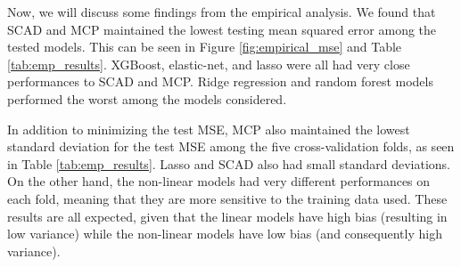 \documentclass{article}
\begin{document}
	
	Now, we will discuss some findings from the empirical analysis.	We found that SCAD and MCP maintained the lowest testing mean squared error among the tested models. This can be seen in Figure \ref{fig:empirical_mse} and Table \ref{tab:emp_results}. XGBoost, elastic-net, and lasso were all had very close performances to SCAD and MCP. Ridge regression and random forest models performed the worst among the models considered.

	In addition to minimizing the test MSE, MCP also maintained the lowest standard deviation for the test MSE among the five cross-validation folds, as seen in Table \ref{tab:emp_results}. Lasso and SCAD also had small standard deviations. On the other hand, the non-linear models had very different performances on each fold, meaning that they are more sensitive to the training data used. These results are all expected, given that the linear models have high bias (resulting in low variance) while the non-linear models have low bias (and consequently high variance). %
\end{document}

